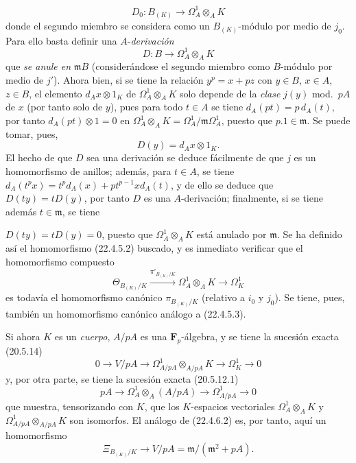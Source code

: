 \begin{remark}[22.4.8]
\begin{equation}
  D_0:B_{(K)}\longrightarrow\Omega^1_A\otimes_AK
  \tag{22.4.8.2}
\end{equation}
donde el segundo miembro se considera como un $B_{(K)}$-módulo por medio de $j_0$.
Para ello basta definir una $A$-\emph{derivación}
\begin{equation}
\label{0.22.4.8.3-fr}
  D:B\longrightarrow\Omega^1_A\otimes_AK
  \tag{22.4.8.3}
\end{equation}
que \emph{se anule en} $\mathfrak mB$ (considerándose el segundo miembro como
$B$-módulo por medio de $j'$). Ahora bien, si se tiene la relación $y^p=x+pz$ con
$y\in B$, $x\in A$, $z\in B$, el elemento $d_Ax\otimes1_K$ de
$\Omega^1_A\otimes_AK$ solo depende de la \emph{clase} $j(y)$ mod.~$pA$ de $x$
(por tanto solo de $y$), pues para todo $t\in A$ se tiene
$d_A(pt)=p\,d_A(t)$, por tanto $d_A(pt)\otimes1=0$ en
$\Omega^1_A\otimes_AK=\Omega^1_A/\mathfrak m\Omega^1_A$, puesto que
$p.1\in\mathfrak m$. Se puede tomar, pues,
\[
  D(y)=d_Ax\otimes1_K.
\]
El hecho de que $D$ sea una derivación se deduce fácilmente de que $j$ es un
homomorfismo de anillos; además, para $t\in A$, se tiene
$d_A(t^px)=t^p d_A(x)+pt^{p-1}x d_A(t)$, y de ello se deduce que
$D(ty)=tD(y)$, por tanto $D$ es una $A$-derivación; finalmente, si se tiene además
$t\in\mathfrak m$, se tiene


$D(ty)=tD(y)=0$, puesto que $\Omega^1_A\otimes_AK$ está anulado por $\mathfrak m$.
Se ha definido así el homomorfismo (22.4.5.2) buscado, y es inmediato
verificar que el homomorfismo compuesto
\[
  \Theta_{B_{(K)}/K}\xrightarrow{\pi'_{B_{(K)}/K}}
  \Omega^1_A\otimes_AK\longrightarrow\Omega^1_K
\]
es todavía el homomorfismo canónico $\pi_{B_{(K)}/K}$ (relativo a $i_0$ y
$j_0$). Se tiene, pues, también un homomorfismo canónico análogo a (22.4.5.3).

Si ahora $K$ es un \emph{cuerpo}, $A/pA$ es una $\mathbf F_p$-álgebra,
y se tiene la sucesión exacta (20.5.14)
\[
  0\longrightarrow V/pA\longrightarrow
  \Omega^1_{A/pA}\otimes_{A/pA}K\longrightarrow\Omega^1_K\longrightarrow0
\]
y, por otra parte, se tiene la sucesión exacta (20.5.12.1)
\[
  pA\longrightarrow\Omega^1_A\otimes_A(A/pA)
  \longrightarrow\Omega^1_{A/pA}\longrightarrow0
\]
que muestra, tensorizando con $K$, que los $K$-espacios vectoriales
$\Omega^1_A\otimes_AK$ y
$\Omega^1_{A/pA}\otimes_{A/pA}K$ son isomorfos. El análogo de (22.4.6.2) es,
por tanto, aquí un homomorfismo
\begin{equation}
\label{0.22.4.8.4-fr}
  \Xi_{B_{(K)}/K}\longrightarrow V/pA=\mathfrak m/(\mathfrak m^2+pA).
  \tag{22.4.8.4}
\end{equation}


\end{remark}

